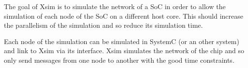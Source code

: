 The goal of Xsim is to simulate the network of a SoC in order to allow the 
simulation of each node of the SoC on a different host core. This should increase
the parallelism of the simulation and so reduce its simulation time.

Each node of the simulation can be simulated in SystemC (or an other system)
and link to Xsim via its interface. Xsim simulates the network of the chip
and so only send messages from one node to another with the good time constraints.

